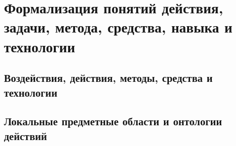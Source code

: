 \chapter{Формализация понятий действия, задачи, метода, средства, навыка и технологии}
\label{chapter_actions}


\section{Воздействия, действия, методы, средства и технологии}
\section{Локальные предметные области и онтологии действий}

%